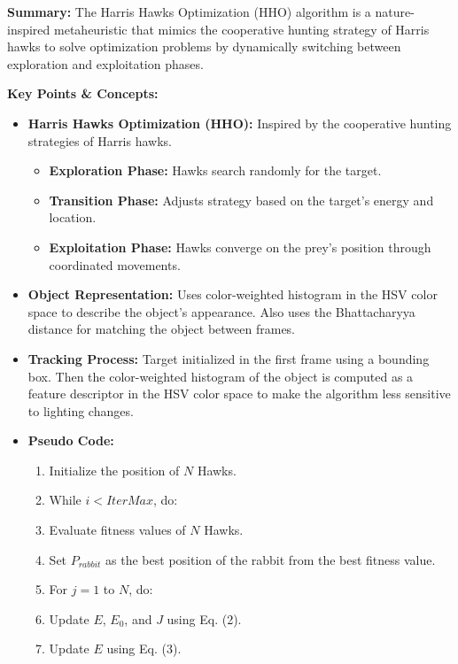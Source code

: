 \documentclass{article}
\begin{document}
\vspace{0.3cm}

\textbf{Summary:} The Harris Hawks Optimization (HHO) algorithm is a nature-inspired metaheuristic that mimics the cooperative hunting strategy of Harris hawks to solve optimization problems by dynamically switching between exploration and exploitation phases.

\vspace{0.3cm}

\textbf{Key Points \& Concepts:}
\begin{itemize}
  \item \textbf{Harris Hawks Optimization (HHO):} Inspired by the cooperative hunting strategies of Harris hawks.
    \begin{itemize}
      \item \textbf{Exploration Phase:} Hawks search randomly for the target.
      \item \textbf{Transition Phase:} Adjusts strategy based on the target's energy and location.
      \item \textbf{Exploitation Phase:} Hawks converge on the prey's position through coordinated movements.
    \end{itemize}
  \item \textbf{Object Representation:} Uses color-weighted histogram in the HSV color space to describe the object's appearance. Also uses the Bhattacharyya distance for matching the object between frames.
  \item \textbf{Tracking Process:} Target initialized in the first frame using a bounding box. Then the color-weighted histogram of the object is computed as a feature descriptor in the HSV color space to make the algorithm less sensitive to lighting changes. 
  \item \textbf{Pseudo Code:}
    \begin{enumerate}
      \item Initialize the position of \(N\) Hawks. 
      \item While \(i < \textit{IterMax}\), do:
      \item Evaluate fitness values of \(N\) Hawks.
      \item Set \(P_{\textit{rabbit}}\) as the best position of the rabbit from the best fitness value.  
      \item For \(j = 1\) to \(N\), do: 
      \item Update \(E\), \(E_0\), and \(J\) using Eq. (2).  
      \item Update \(E\) using Eq. (3).  

\end{enumerate}
\end{itemize}
\end{document}
